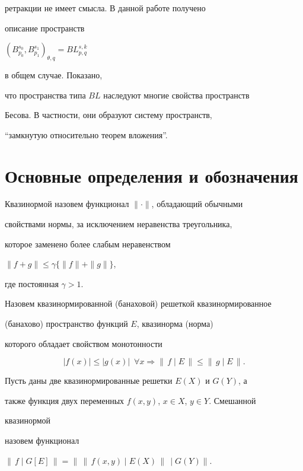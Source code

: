 ретракции не имеет смысла. В данной работе получено 


описание пространств 


$(B^{s_0}_{p_0},B^{s_1}_{p_1})_{\theta,q}=BL^{s,k}_{p,q}$ 


в общем случае. Показано, 


что пространства типа $BL$ наследуют многие свойства пространств 


Бесова. В частности, они образуют систему пространств, 


``замкнутую относительно теорем вложения''. 


 


\section{Основные определения и обозначения} 


 


Квазинормой назовем функционал $\|\cdot\|$, обладающий обычными 


свойствами нормы, за исключением неравенства треугольника, 


которое заменено более слабым неравенством 


$\|f+g\|\le\gamma\{\|f\|+\|g\|\}$, 


где постоянная $\gamma>1$. 


 


Назовем квазинормированной (банаховой) решеткой квазинормированное 


(банахово) пространство функций $E$, квазинорма (норма)  


которого обладает свойством монотонности 


$$ 


|f(x)|\le|g(x)|\ \; \forall x\Rightarrow\|\,f\mid E\,\|\le 


\|\,g\mid E\,\|. 


$$ 


 


Пусть даны две квазинормированные решетки $E(X)$ и $G(Y)$, а 


также функция двух переменных $f(x,y)$, $x\in X$, $y\in Y$. Смешанной 


квазинормой 


назовем функционал 


$\|\,f\mid G[E]\,\|=\big\|\,\|\,f(x,y)\mid E(X)\,\|\,\mid G(Y)\big\|$. 


